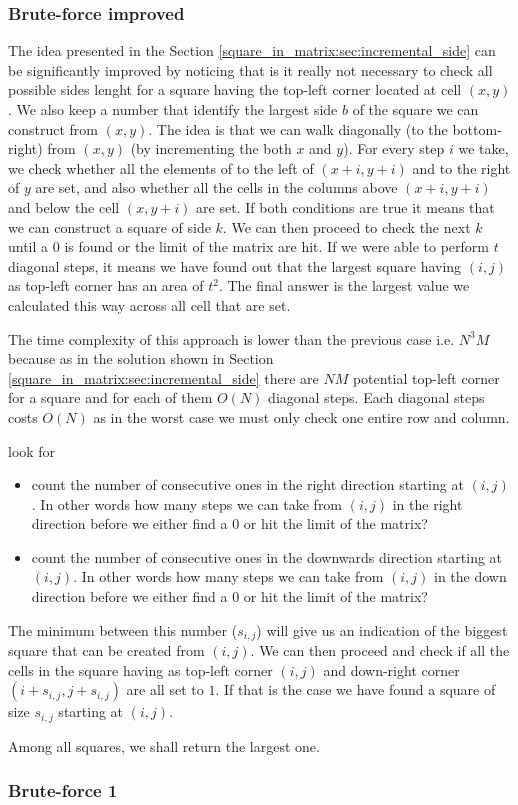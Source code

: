 \subsubsection{Brute-force improved}
The idea presented in the Section \ref{square_in_matrix:sec:incremental_side}
can be significantly improved by noticing that is it really not necessary to
check all possible sides lenght for a square having the top-left corner located
at cell $(x,y)$. We also keep a number that identify the largest side $b$ of the
square we can construct from $(x,y)$. The idea is that we can walk diagonally (to the bottom-right)
from $(x,y)$ (by incrementing the both $x$ and $y$). For every step $i$ we take,
we check whether all the elements of to the left of $(x+i, y+i)$  and to the
right of  $y$ are set, and also whether all the cells in the columns above
$(x+i, y+i)$ and below the cell $(x,y+i)$ are set. If both conditions are true
it means that we can construct a square of side $k$. We can then proceed to
check the next $k$ until a $0$ is found or the limit of the matrix are hit. If
we were able to perform $t$ diagonal steps,
it means we have found out that the largest square having $(i,j)$ as top-left
corner has an area of $t^2$. The final answer is the largest value we calculated
this way across all cell that are set. 

The time complexity of this approach is lower than the previous case i.e. $N^3M$
because as in the solution shown in Section
\ref{square_in_matrix:sec:incremental_side} there are $NM$ potential top-left
corner for a square and for each of them $O(N)$ diagonal steps. Each diagonal
steps costs $O(N)$ as in the worst case we must only check one entire row and
column. 






look for 
\begin{itemize}
	 \item count the number of consecutive ones in the right direction starting at $(i,j)$. In other
	 words how many steps we can take from $(i,j)$ in the right direction  before we either find a
	 $0$ or hit the limit of the matrix? 
	 \item count the number of consecutive ones in the downwards direction starting at $(i,j)$. In
	 other words how many steps we can take from $(i,j)$ in the down direction before we either find
	 a $0$ or hit the limit of the matrix? 
\end{itemize}
The minimum between this number ($s_{i,j}$) will give us an indication of the biggest square that
can be created from $(i,j)$. We can then proceed and check if all the cells in the square having as
top-left corner $(i,j)$ and down-right corner $(i+s_{i,j},j+s_{i,j})$ are all set to $1$. If that is
the case we have found a square of size $s_{i,j}$ starting at $(i,j)$. 

Among all squares, we shall return the largest one. 




\subsubsection{Brute-force 1}


